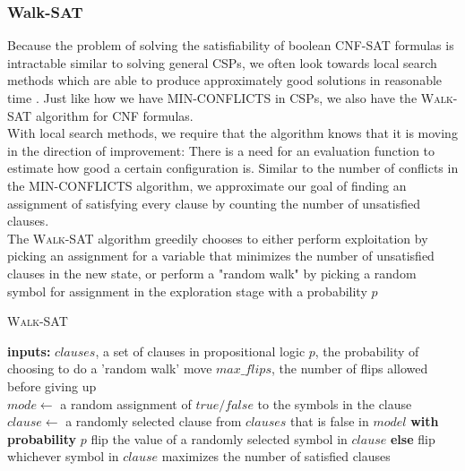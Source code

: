 \documentclass[12pt]{article}
\begin{document}
\subsubsection{Walk-SAT}

Because the problem of solving the satisfiability of boolean CNF-SAT formulas is intractable similar to solving general CSPs, we often look towards local search methods which are able to produce approximately good solutions in reasonable time
. Just like how we have \textsc{MIN-CONFLICTS} in CSPs, we also have the \textsc{Walk-SAT} algorithm for CNF formulas.\\

With local search methods, we require that the algorithm knows that it is moving in the direction of improvement: There is a need for an evaluation function to estimate how good a certain configuration is. Similar to the number of conflicts in the \textsc{MIN-CONFLICTS} algorithm, we approximate our goal of finding an assignment of satisfying every clause by counting the number of unsatisfied clauses.\\

The \textsc{Walk-SAT} algorithm greedily chooses to either perform exploitation by picking an assignment for a variable that minimizes the number of unsatisfied clauses in the new state, or perform a "random walk" by picking a random symbol for assignment in the exploration stage with a probability $p$

\begin{algorithm}
\caption{\textsc{Walk-SAT}}\label{euclid}
\begin{algorithmic}[1]
\State \textbf{inputs:}
\State $clauses$, a set of clauses in propositional logic
\State $p$, the probability of choosing to do a 'random walk' move
\State $max\_flips$, the number of flips allowed before giving up\\

\State $mode \leftarrow$ a random assignment of $true/false$ to the symbols in the clause
  \EndIf
\State $clause \leftarrow$ a randomly selected clause from $clauses$ that is false in $model$
\State \textbf{with probability} $p$ flip the value of a randomly selected symbol in $clause$
\State \textbf{else} flip whichever symbol in $clause$ maximizes the number of satisfied clauses
\EndFor
\State {}
\end{algorithmic}
\end{algorithm}
\end{document}
